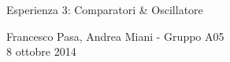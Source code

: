 \documentclass[11pt, twoside, a4paper]{article}
\begin{document}
  \begin{center}
  
    {\huge Esperienza 3: Comparatori \& Oscillatore}
    
    \vspace{0.1cm}
    
    {Francesco Pasa, Andrea Miani - Gruppo A05} \\
    {8 ottobre 2014}
    
    \vspace{-0.1cm}
    
  \end{center}
  
  
  
  
  
\end{document}
